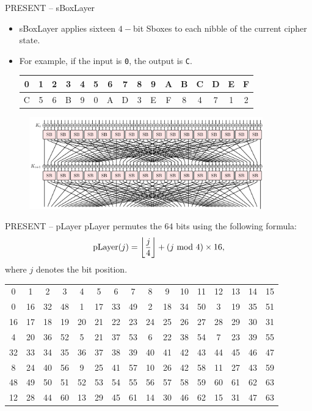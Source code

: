 \begin{frame}{PRESENT -- sBoxLayer}
    \begin{itemize}
        \item sBoxLayer applies sixteen $4-$bit Sboxes to each nibble of the current cipher state.
        \item For example, if the input is \texttt{0}, the output is \texttt{C}.
\begin{table}[htb]
\centering
\ttfamily
\begin{tabular}{cccccccccccccccc}\hline
 0 & 1 & 2 & 3 & 4 & 5 & 6 & 7 & 8 & 9 & A & B & C & D & E & F \\\hline
 C & 5 & 6 & B & 9 & 0 & A & D & 3 & E & F & 8 & 4 & 7 & 1 & 2\\\hline
\end{tabular}
\end{table}
    \end{itemize}
\begin{figure}
    \centering
    \includegraphics[width=0.9\textwidth]{fig/PRESENT_two_rounds.pdf}
\end{figure}
\end{frame}


\begin{frame}{PRESENT -- pLayer}
pLayer permutes the $64$ bits using the following formula:
\[
\text{pLayer}(j)=\left\lfloor\frac{j}{4}\right\rfloor+(j\textrm{~mod~} 4)\times16,
\]
where $j$ denotes the bit position.
\begin{table}[htb]
\centering
\begin{tabular}{cccccccccccccccc}\hline
0 & 1 & 2 & 3 & 4 & 5 & 6 & 7 & 8 & 9 & 10 & 11 & 12 & 13 & 14 & 15 \\
0 & 16 & 32 & 48 & 1 & 17 & 33 & 49 & 2 & 18 & 34 & 50 & 3 & 19 & 35 & 51 \\\hline
16 & 17 & 18 & 19 & 20 & 21 & 22 & 23 & 24 & 25 & 26 & 27 & 28 & 29 & 30 & 31 \\
4 & 20 & 36 & 52 & 5 & 21 & 37 & 53 & 6 & 22 & 38 & 54 & 7 & 23 & 39 & 55 \\\hline
32 & 33 & 34 & 35 & 36 & 37 & 38 & 39 & 40 & 41 & 42 & 43 & 44 & 45 & 46 & 47 \\
8 & 24 & 40 & 56 & 9 & 25 & 41 & 57 & 10 & 26 & 42 & 58 & 11 & 27 & 43 & 59 \\\hline
48 & 49 & 50 & 51 & 52 & 53 & 54 & 55 & 56 & 57 & 58 & 59 & 60 & 61 & 62 & 63 \\
12 & 28 & 44 & 60 & 13 & 29 & 45 & 61 & 14 & 30 & 46 & 62 & 15 & 31 & 47 & 63\\\hline
\end{tabular}
\end{table}
\end{frame}

